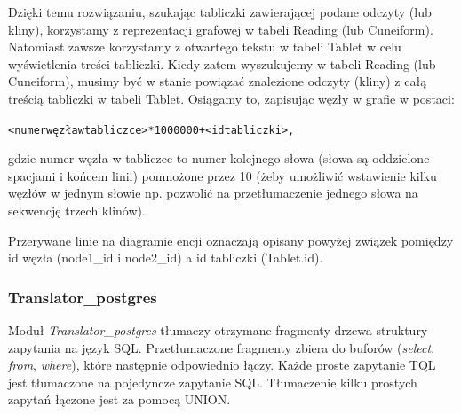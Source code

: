 Dzięki temu rozwiązaniu, szukając tabliczki zawierającej podane odczyty (lub kliny), korzystamy z reprezentacji
grafowej w tabeli Reading (lub Cuneiform).
Natomiast zawsze korzystamy z otwartego tekstu w tabeli Tablet w celu wyświetlenia treści tabliczki.
Kiedy zatem wyszukujemy w tabeli Reading (lub Cuneiform), musimy być w stanie powiązać znalezione odczyty (kliny) 
z całą treścią tabliczki w tabeli Tablet. Osiągamy to, zapisując węzły w grafie w postaci:
\begin{alltt}
 <numer węzła w tabliczce> * 1 000 000 + <id tabliczki>\normalfont,
\end{alltt}
gdzie numer węzła w tabliczce to numer kolejnego słowa (słowa są oddzielone spacjami i końcem linii) pomnożone przez 10 
(żeby umożliwić wstawienie kilku węzłów w jednym słowie np. pozwolić na przetłumaczenie jednego słowa na sekwencję trzech klinów). 


Przerywane linie na diagramie encji oznaczają opisany powyżej związek pomiędzy id węzła (node1\_id i node2\_id) 
a id tabliczki (Tablet.id).


 

\subsubsection{Translator\_postgres}
Moduł \textit{Translator\_postgres} tłumaczy otrzymane fragmenty drzewa struktury zapytania na język SQL. Przetłumaczone fragmenty zbiera do buforów 
(\textit{select}, \textit{from}, \textit{where}), które następnie odpowiednio łączy.
Każde proste zapytanie TQL jest tłumaczone na pojedyncze zapytanie SQL. Tłumaczenie kilku prostych zapytań
łączone jest za pomocą UNION.

